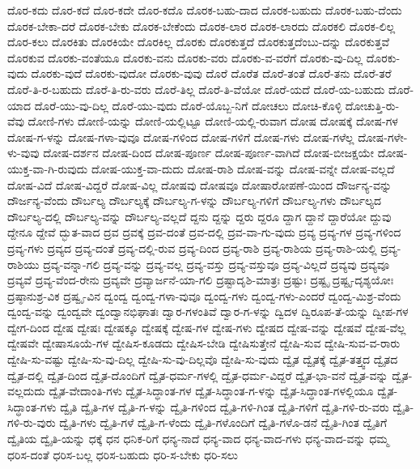 {ದೊರ-ಕದು
ದೊರ-ಕದೆ
ದೊರ-ಕದೇ
ದೊರ-ಕದೊ
ದೊರಕ-ಬಹು-ದಾದ
ದೊರಕ-ಬಹುದು
ದೊರಕ-ಬಹು-ದೆಂದು
ದೊರಕ-ಬೇಕಾ-ದರೆ
ದೊರಕ-ಬೇಕು
ದೊರಕ-ಬೇಕೆಂದು
ದೊರಕ-ಲಾರ
ದೊರಕ-ಲಾರದು
ದೊರಕಲಿ
ದೊರಕ-ಲಿಲ್ಲ
ದೊರ-ಕಲು
ದೊರಕಿತು
ದೊರಕಿಯೇ
ದೊರಕಿಲ್ಲ
ದೊರಕು
ದೊರಕುತ್ತದೆ
ದೊರಕುತ್ತದೆಂಬು-ದನ್ನು
ದೊರಕುತ್ತವೆ
ದೊರಕುವ
ದೊರಕು-ವಂತೆಯೂ
ದೊರಕು-ವನು
ದೊರಕು-ವರು
ದೊರಕು-ವ-ವರೆಗೆ
ದೊರಕು-ವು-ದಿಲ್ಲ
ದೊರಕು-ವುದು
ದೊರಕು-ವುದೆ
ದೊರಕು-ವುದೋ
ದೊರಕು-ವುವು
ದೊರೆ
ದೊರೆತ
ದೊರೆ-ತಂತೆ
ದೊರೆ-ತನು
ದೊರೆ-ತರೆ
ದೊರೆ-ತಿ-ರ-ಬಹುದು
ದೊರೆ-ತಿ-ರು-ವರು
ದೊರೆ-ತಿಲ್ಲ
ದೊರೆ-ತಿ-ವೆಯೋ
ದೊರೆ-ಯದೆ
ದೊರೆ-ಯ-ಬಹುದು
ದೊರೆ-ಯಾದ
ದೊರೆ-ಯು-ವು-ದಿಲ್ಲ
ದೊರೆ-ಯು-ವುದು
ದೊರೆ-ಯೊಬ್ಬ-ನಿಗೆ
ದೋಚಲು
ದೋಚಿ-ಕೊಳ್ಳಿ
ದೋಚುತ್ತಿ-ರು-ವೆವು
ದೋಣಿ-ಗಳು
ದೋಣಿ-ಯನ್ನು
ದೋಣಿ-ಯಲ್ಲಿಟ್ಟೂ
ದೋಣಿ-ಯಲ್ಲಿ-ರುವಾಗ
ದೋಷ
ದೋಷಕ್ಕೆ
ದೋಷ-ಗಳ
ದೋಷ-ಗ-ಳನ್ನು
ದೋಷ-ಗಳಾ-ವುವೂ
ದೋಷ-ಗಳಿಂದ
ದೋಷ-ಗಳಿಗೆ
ದೋಷ-ಗಳು
ದೋಷ-ಗಳೆಲ್ಲ
ದೋಷ-ಗಳೇ-ಳು-ವುವು
ದೋಷ-ದರ್ಶನ
ದೋಷ-ದಿಂದ
ದೋಷ-ಪೂರ್ಣ
ದೋಷ-ಪೂರ್ಣ-ವಾಗಿದೆ
ದೋಷ-ಬೀಜಕ್ಷಯೇ
ದೋಷ-ಯುಕ್ತ-ವಾ-ಗಿ-ರುವುದು
ದೋಷ-ಯುಕ್ತ-ವಾ-ದುದು
ದೋಷ-ರಾಶಿ
ದೋಷ-ವನ್ನು
ದೋಷ-ವನ್ನೇ
ದೋಷ-ವಲ್ಲದೆ
ದೋಷ-ವಿದೆ
ದೋಷ-ವಿದ್ದರೆ
ದೋಷ-ವಿಲ್ಲ
ದೋಷವು
ದೋಷವೂ
ದೋಷಾರೋಪಣೆ-ಯಿಂದ
ದೌರ್ಜನ್ಯ-ವನ್ನು
ದೌರ್ಜನ್ಯ-ವೆಂದು
ದೌರ್ಬಲ್ಯ
ದೌರ್ಬಲ್ಯಕ್ಕೆ
ದೌರ್ಬಲ್ಯ-ಗ-ಳನ್ನು
ದೌರ್ಬಲ್ಯ-ಗಳಿಗೆ
ದೌರ್ಬಲ್ಯ-ಗಳು
ದೌರ್ಬಲ್ಯದ
ದೌರ್ಬಲ್ಯ-ದಲ್ಲಿ
ದೌರ್ಬಲ್ಯ-ವನ್ನು
ದೌರ್ಬಲ್ಯ-ವಲ್ಲದೆ
ದ್ದನು
ದ್ದನ್ನು
ದ್ದರು
ದ್ದರೂ
ದ್ದಾಗ
ದ್ದಾನೆ
ದ್ದಾರೆಯೋ
ದ್ದುವು
ದ್ದೇನೂ
ದ್ದೇವೆ
ದ್ಭುತ-ವಾದ
ದ್ರವ
ದ್ರವಕ್ಕೆ
ದ್ರವ-ದಂತೆ
ದ್ರವ-ದಲ್ಲಿ
ದ್ರವ-ವಾ-ಗು-ವುದು
ದ್ರವ್ಯ
ದ್ರವ್ಯ-ಗಳ
ದ್ರವ್ಯ-ಗಳಿಂದ
ದ್ರವ್ಯ-ಗಳು
ದ್ರವ್ಯದ
ದ್ರವ್ಯ-ದಂತೆ
ದ್ರವ್ಯ-ದಲ್ಲಿ-ರುವ
ದ್ರವ್ಯ-ದಿಂದ
ದ್ರವ್ಯ-ರಾಶಿ
ದ್ರವ್ಯ-ರಾಶಿಯ
ದ್ರವ್ಯ-ರಾಶಿ-ಯಲ್ಲಿ
ದ್ರವ್ಯ-ರಾಶಿಯು
ದ್ರವ್ಯ-ವನ್ನಾ-ಗಲಿ
ದ್ರವ್ಯ-ವನ್ನು
ದ್ರವ್ಯ-ವಲ್ಲ
ದ್ರವ್ಯ-ವಸ್ತು
ದ್ರವ್ಯ-ವಸ್ತುವೂ
ದ್ರವ್ಯ-ವಿಲ್ಲದೆ
ದ್ರವ್ಯವು
ದ್ರವ್ಯವೂ
ದ್ರವ್ಯವೆ
ದ್ರವ್ಯ-ವೆಂದ-ರೇನು
ದ್ರವ್ಯವೇ
ದ್ರವ್ಯಾರ್ಜನೆ-ಯಾ-ಗಲಿ
ದ್ರಷ್ಟಾದೃಶಿ-ಮಾತ್ರಃ
ದ್ರಷ್ಟುಃ
ದ್ರಷ್ಟೃ
ದ್ರಷ್ಟೃ-ದೃಶ್ಯಯೋಃ
ದ್ರಷ್ಠಾನುಶ್ರ-ವಿಕ
ದ್ರಷ್ವೃ-ವಿನ
ದ್ವಂದ್ವ
ದ್ವಂದ್ವ-ಗಳಾ-ವುವೂ
ದ್ವಂದ್ವ-ಗಳು
ದ್ವಂದ್ವ-ಗಳು-ಎಂದರೆ
ದ್ವಂದ್ವ-ಮಿಶ್ರ-ವೆಂದು
ದ್ವಂದ್ವ-ವನ್ನು
ದ್ವಂದ್ವವೇ
ದ್ವಂದ್ವಾನಭಿಘಾತಃ
ದ್ವಾರ-ಗಳಂತಿವೆ
ದ್ವಾರ-ಗ-ಳನ್ನು
ದ್ವಿದಳ
ದ್ವಿರೂಪ-ತೆ-ಯನ್ನು
ದ್ವೀಪ-ಗಳ
ದ್ವೇಗ-ದಿಂದ
ದ್ವೇಷ
ದ್ವೇಷಃ
ದ್ವೇಷಕ್ಕೂ
ದ್ವೇಷಕ್ಕೆ
ದ್ವೇಷ-ಗಳ
ದ್ವೇಷ-ಗಳು
ದ್ವೇಷದ
ದ್ವೇಷ-ವನ್ನು
ದ್ವೇಷವೆ
ದ್ವೇಷ-ವೆಲ್ಲ
ದ್ವೇಷವೇ
ದ್ವೇಷಾಸೂಯೆ-ಗಳ
ದ್ವೇಷಿಸ-ಕೂಡದು
ದ್ವೇಷಿಸ-ಬೇಡಿ
ದ್ವೇಷಿಸುತ್ತೇನೆ
ದ್ವೇಷಿ-ಸುವ
ದ್ವೇಷಿ-ಸುವ-ವ-ರಾರು
ದ್ವೇಷಿ-ಸು-ವಷ್ಟು
ದ್ವೇಷಿ-ಸು-ವು-ದಿಲ್ಲ
ದ್ವೇಷಿ-ಸು-ವು-ದಿಲ್ಲವೊ
ದ್ವೇಷಿ-ಸು-ವುದು
ದ್ವೈತ
ದ್ವೈತಕ್ಕೆ
ದ್ವೈತ-ತತ್ತ್ವದ
ದ್ವೈತದ
ದ್ವೈತ-ದಲ್ಲಿ
ದ್ವೈತ-ದಿಂದ
ದ್ವೈತ-ದೊಂದಿಗೆ
ದ್ವೈತ-ಧರ್ಮ-ಗಳಲ್ಲಿ
ದ್ವೈತ-ಧರ್ಮ-ವಿದ್ದರೆ
ದ್ವೈತ-ಭಾ-ವನೆ
ದ್ವೈತ-ವನ್ನು
ದ್ವೈತ-ವಲ್ಲದುದು
ದ್ವೈತ-ವೇದಾಂತಿ-ಗಳು
ದ್ವೈತ-ಸಿದ್ಧಾಂತ-ಗಳ
ದ್ವೈತ-ಸಿದ್ಧಾಂತ-ಗ-ಳನ್ನು
ದ್ವೈತ-ಸಿದ್ಧಾಂತ-ಗಳಲ್ಲಿಯೂ
ದ್ವೈತ-ಸಿದ್ಧಾಂತ-ಗಳು
ದ್ವೈತಿ
ದ್ವೈತಿ-ಗಳ
ದ್ವೈತಿ-ಗ-ಳನ್ನು
ದ್ವೈತಿ-ಗಳಿಂದ
ದ್ವೈತಿ-ಗಳಿ-ಗಿಂತ
ದ್ವೈತಿ-ಗಳಿಗೆ
ದ್ವೈತಿ-ಗಳಿ-ರು-ವರು
ದ್ವೈತಿ-ಗಳಿ-ರು-ವುರು
ದ್ವೈತಿ-ಗಳು
ದ್ವೈತಿ-ಗಳೆ
ದ್ವೈತಿ-ಗ-ಳೆಂದು
ದ್ವೈತಿ-ಗಳೊಂದಿಗೆ
ದ್ವೈತಿ-ಗಳೊ-ಡನೆ
ದ್ವೈತಿ-ಗಿಂತ
ದ್ವೈತಿಗೆ
ದ್ವೈತಿಯ
ದ್ವೈತಿ-ಯನ್ನು
ಧಕ್ಕೆ
ಧನ
ಧನಿಕ-ರಿಗೆ
ಧನ್ಯ-ನಾದೆ
ಧನ್ಯ-ವಾದ
ಧನ್ಯ-ವಾದ-ಗಳು
ಧನ್ಯ-ವಾದ-ವನ್ನು
ಧಮ್ಮ
ಧರಿಸ-ದಂತೆ
ಧರಿಸ-ಬಲ್ಲ
ಧರಿಸ-ಬಹುದು
ಧರಿ-ಸ-ಬೇಕು
ಧರಿ-ಸಲು
}
